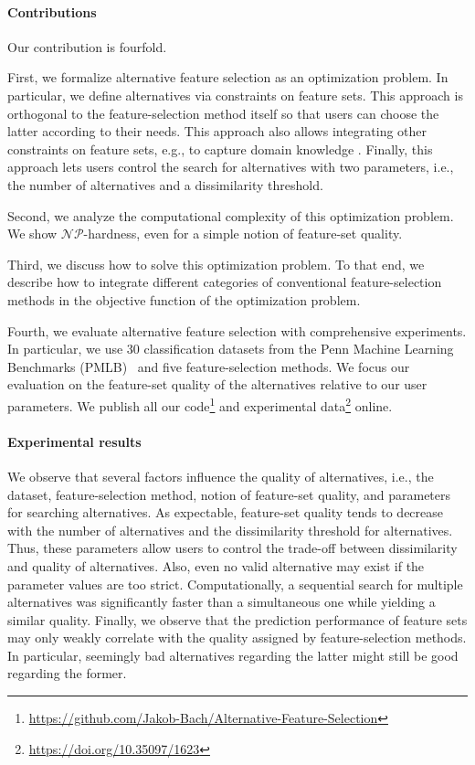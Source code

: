 \documentclass{article}
\theoremstyle{definition}
\begin{document}
\paragraph{Contributions}

Our contribution is fourfold.

First, we formalize alternative feature selection as an optimization problem.
In particular, we define alternatives via constraints on feature sets.
This approach is orthogonal to the feature-selection method itself so that users can choose the latter according to their needs.
This approach also allows integrating other constraints on feature sets, e.g., to capture domain knowledge \cite{bach2022empirical, groves2015toward}.
Finally, this approach lets users control the search for alternatives with two parameters, i.e., the number of alternatives and a dissimilarity threshold.

Second, we analyze the computational complexity of this optimization problem.
We show $\mathcal{NP}$-hardness, even for a simple notion of feature-set quality.

Third, we discuss how to solve this optimization problem.
To that end, we describe how to integrate different categories of conventional feature-selection methods in the objective function of the optimization problem.

Fourth, we evaluate alternative feature selection with comprehensive experiments.
In particular, we use 30 classification datasets from the Penn Machine Learning Benchmarks (PMLB)~\cite{olson2017pmlb, romano2021pmlb} and five feature-selection methods.
We focus our evaluation on the feature-set quality of the alternatives relative to our user parameters.
We publish all our code\footnote{\url{https://github.com/Jakob-Bach/Alternative-Feature-Selection}} and experimental data\footnote{\url{https://doi.org/10.35097/1623}} online.

\paragraph{Experimental results}

We observe that several factors influence the quality of alternatives, i.e., the dataset, feature-selection method, notion of feature-set quality, and parameters for searching alternatives.
As expectable, feature-set quality tends to decrease with the number of alternatives and the dissimilarity threshold for alternatives.
Thus, these parameters allow users to control the trade-off between dissimilarity and quality of alternatives.
Also, even no valid alternative may exist if the parameter values are too strict.
Computationally, a sequential search for multiple alternatives was significantly faster than a simultaneous one while yielding a similar quality.
Finally, we observe that the prediction performance of feature sets may only weakly correlate with the quality assigned by feature-selection methods.
In particular, seemingly bad alternatives regarding the latter might still be good regarding the former.
\end{document}
